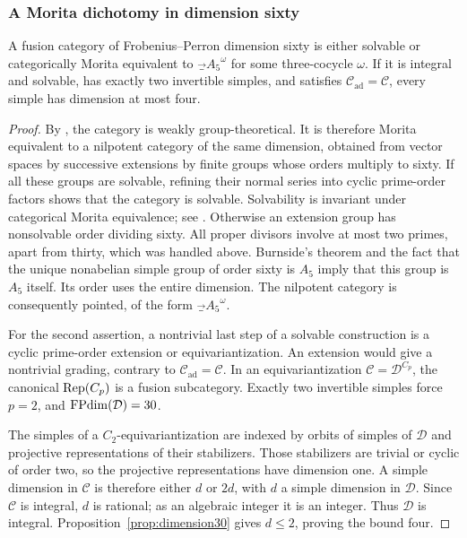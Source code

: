 \subsubsection{A Morita dichotomy in dimension sixty}
\begin{lemma}\label{lem:sixty-dichotomy}
A fusion category of Frobenius--Perron dimension sixty is either solvable
or categorically Morita equivalent to $\Vec_{A_5}^{\omega}$ for some
three-cocycle $\omega$.
If it is integral and solvable, has exactly two invertible simples, and
satisfies $\mathcal C_{\mathrm{ad}}=\mathcal C$, every simple has dimension
at most four.
\end{lemma}
\begin{proof}
By \cite[Theorem~9.16]{ENOWGT}, the category is weakly group-theoretical.
It is therefore Morita equivalent to a nilpotent category of the same
dimension, obtained from vector spaces by successive extensions by
finite groups whose orders multiply to sixty. If all these groups are
solvable, refining their normal series into cyclic prime-order factors
shows that the category is solvable. Solvability is invariant under
categorical Morita equivalence; see \cite[Section~4.2]{ENOWGT}.
Otherwise an extension group has nonsolvable order dividing sixty.
All proper divisors involve at most two primes, apart from thirty,
which was handled above. Burnside's theorem and the fact that the unique
nonabelian simple group of order sixty is $A_5$ imply that this group is
$A_5$ itself. Its order uses the entire dimension. The nilpotent category
is consequently pointed, of the form $\Vec_{A_5}^{\omega}$.

For the second assertion, a nontrivial last step of a solvable
construction is a cyclic prime-order extension or equivariantization.
An extension would give a nontrivial grading, contrary to
$\mathcal C_{\mathrm{ad}}=\mathcal C$. In an equivariantization
$\mathcal C=\mathcal D^{C_p}$, the canonical $\operatorname{Rep}(C_p)$ is a fusion
subcategory. Exactly two invertible simples force $p=2$, and
$\operatorname{FPdim}(\mathcal D)=30$.

The simples of a $C_2$-equivariantization are indexed by orbits of simples
of $\mathcal D$ and projective representations of their stabilizers.
Those stabilizers are trivial or cyclic of order two, so the projective
representations have dimension one. A simple dimension in $\mathcal C$
is therefore either $d$ or $2d$, with $d$ a simple dimension in
$\mathcal D$. Since $\mathcal C$ is integral, $d$ is rational; as an
algebraic integer it is an integer. Thus $\mathcal D$ is integral.
Proposition~\ref{prop:dimension30} gives $d\leq2$, proving the bound four.
\end{proof}


